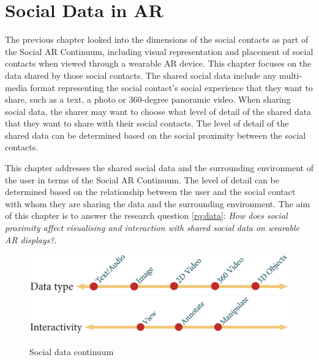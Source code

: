 \chapter{Social Data in AR} 
\label{ch:data} 


The previous chapter looked into the dimensions of the social contacts as part of the Social AR Continuum, including visual representation and placement of social contacts when viewed through a wearable AR device. This chapter focuses on the data shared by those social contacts. The shared social data include any multi-media format representing the social contact's social experience that they want to share, such as a text, a photo or 360-degree panoramic video. When sharing social data, the sharer may want to choose what level of detail of the shared data that they want to share with their social contacts. The level of detail of the shared data can be determined based on the social proximity between the social contacts. 

This chapter addresses the shared social data and the surrounding environment of the user in terms of the Social AR Continuum. The level of detail can be determined based on the relationship between the user and the social contact with whom they are sharing the data and the surrounding environment. The aim of this chapter is to answer the research question \ref{rq:data}: \textit{How does social proximity affect visualising and interaction with shared social data on wearable AR displays?}. 


\begin{figure}[h]
  \centering
  \includegraphics[width=\columnwidth]{images/30-continuum/continuum4_2-03.eps}
  \includegraphics[width=\columnwidth]{images/30-continuum/continuum4_2-04.eps}
  \caption{Social data continuum}
  \label{fig:surrounding:data-continuum}
\end{figure}

